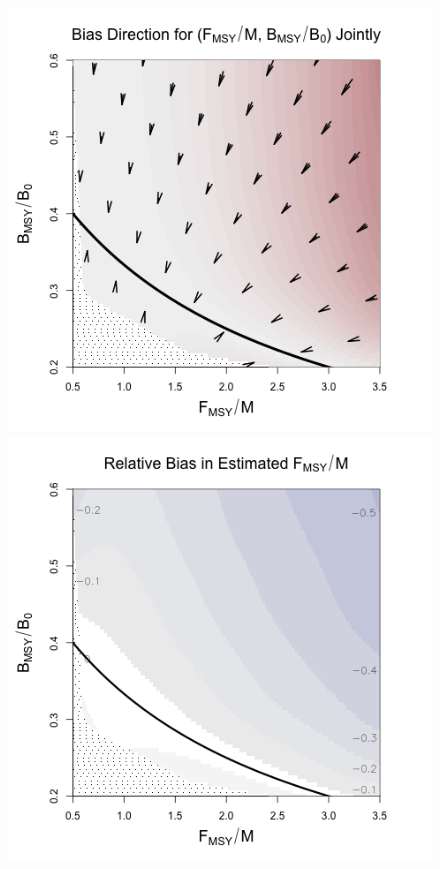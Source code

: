 \documentclass[12pt]{article}
\begin{document}
\begin{figure}[h!]
\begin{minipage}[h!]{0.49\textwidth}
\includegraphics[width=1.1\textwidth]{../gpBias/directionalBiasSchnuteSubTitleExpT45N150Wide.png}\\
\hspace*{1cm}
\includegraphics[width=1.1\textwidth]{../gpBias/fMSYRelBiasSchnuteExpT45N150Wide.png}
\end{minipage}
\end{figure}
\end{document}
